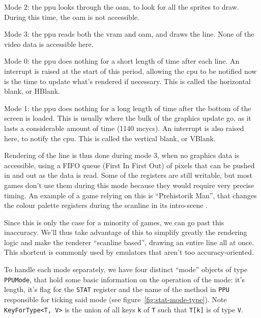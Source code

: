 \documentclass[11pt]{report}
\begin{document}
\begin{compactitem}
	\item Mode 2: the \gls{ppu} looks through the \gls{oam}, to look for all the sprites to draw. During this time, the \gls{oam} is not accessible.
	\item Mode 3: the \gls{ppu} reads both the \gls{vram} and \gls{oam}, and draws the line. None of the video data is accessible here.
	\item Mode 0: the \gls{ppu} does nothing for a short length of time after each line. An interrupt is raised at the start of this period, allowing the \gls{cpu} to be notified now is the time to update what's rendered if necessary. This is called the horizontal blank, or HBlank.
	\item Mode 1: the \gls{ppu} does nothing for a long length of time after the bottom of the screen is loaded. This is usually where the bulk of the graphics update go, as it lasts a considerable amount of time (1140 \glspl{mcyc}). An interrupt is also raised here, to notify the \gls{cpu}. This is called the vertical blank, or VBlank.
\end{compactitem}

Rendering of the line is thus done during mode 3, when no graphics data is accessible, using a FIFO queue (First In First Out) of pixels that can be pushed in and out as the data is read. Some of the registers are still writable, but most games don't use them during this mode because they would require very precise timing. An example of a game relying on this is ``Prehistorik Man'', that changes the colour palette registers during the scanline in its intro-scene \cite[Tricky-to-emulate games]{gbdev_wiki}.

Since this is only the case for a minority of games, we can go past this inaccuracy. We'll thus take advantage of this to simplify greatly the rendering logic and make the renderer ``scanline based'', drawing an entire line all at once. This shortcut is commonly used by emulators that aren't too accuracy-oriented.

To handle each mode separately, we have four distinct ``mode'' objects of type \texttt{PPUMode}, that hold some basic information on the operation of the mode: it's length, it's flag for the \texttt{STAT} register and the name of the method in \texttt{PPU} responsible for ticking said mode (see figure~\ref{fig:stat-mode-type}). Note \texttt{KeyForType<T, V>} is the union of all keys \texttt{k} of \texttt{T} such that \texttt{T[k]} is of type \texttt{V}.
\end{document}
